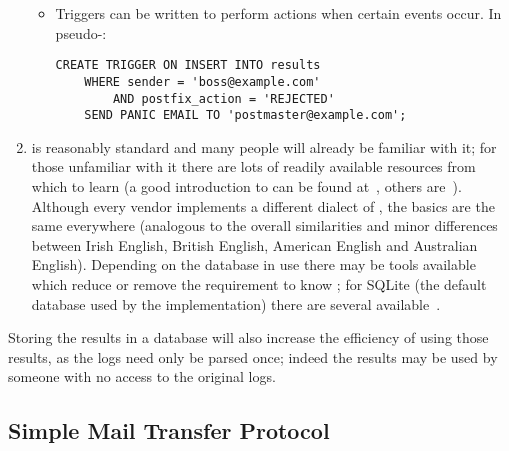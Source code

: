 \documentclass[a4paper,12pt,draft]{article}
\begin{document}
\begin{enumerate}
\begin{itemize}
            \item Triggers can be written to perform actions when certain
                events occur.  In pseudo-\SQL{}\@:

\begin{verbatim}
CREATE TRIGGER ON INSERT INTO results
    WHERE sender = 'boss@example.com'
        AND postfix_action = 'REJECTED'
    SEND PANIC EMAIL TO 'postmaster@example.com';
\end{verbatim}

        \end{itemize}


    \item \SQL{} is reasonably standard and many people will already be
        familiar with it; for those unfamiliar with it there are lots of
        readily available resources from which to learn (a good
        introduction to \SQL{} can be found at~\cite{sql-for-web-nerds},
        others are~\cite{w3schools-sql-tutorial, sqlcourse.com}).  Although
        every vendor implements a different dialect of \SQL{}, the basics
        are the same everywhere (analogous to the overall similarities and
        minor differences between Irish English, British English, American
        English and Australian English).  Depending on the database in use
        there may be tools available which reduce or remove the requirement
        to know \SQL{}; for SQLite (the default database used by the
        implementation) there are several available~\cite{sqlite-guis}.

\end{enumerate}

Storing the results in a database will also increase the efficiency of
using those results, as the logs need only be parsed once; indeed the
results may be used by someone with no access to the original logs.



\subsection{Simple Mail Transfer Protocol}
\label{SMTP background}
\end{document}
